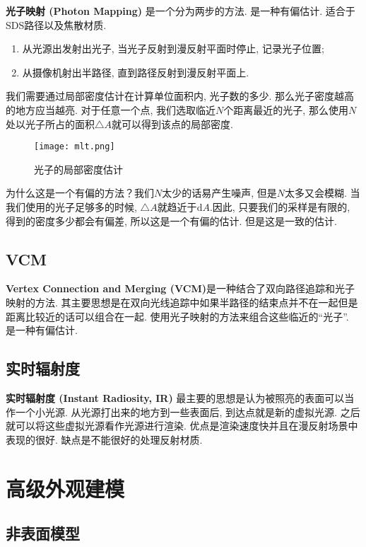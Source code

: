 \textbf{光子映射 (Photon Mapping) }是一个分为两步的方法. 是一种有偏估计. 适合于SDS路径以及焦散材质. 
\begin{enumerate}
	\item 从光源出发射出光子, 当光子反射到漫反射平面时停止, 记录光子位置; 
	\item 从摄像机射出半路径, 直到路径反射到漫反射平面上. 
\end{enumerate}

我们需要通过局部密度估计在计算单位面积内, 光子数的多少. 那么光子密度越高的地方应当越亮. 对于任意一个点, 我们选取临近$N$个距离最近的光子, 那么使用$N$处以光子所占的面积$\triangle A$就可以得到该点的局部密度. 

\begin{figure}[H]
	\centering
	\texttt{[image: mlt.png]}
	\caption{光子的局部密度估计}
	\label{fig:mlt}
\end{figure}

为什么这是一个有偏的方法？我们$N$太少的话易产生噪声, 但是$N$太多又会模糊. 当我们使用的光子足够多的时候, $\triangle A$就趋近于$\text{d}A$.因此, 只要我们的采样是有限的, 得到的密度多少都会有偏差, 所以这是一个有偏的估计. 但是这是一致的估计. 

\subsection{VCM}

\textbf{Vertex Connection and Merging (VCM)}是一种结合了双向路径追踪和光子映射的方法. 其主要思想是在双向光线追踪中如果半路径的结束点并不在一起但是距离比较近的话可以组合在一起. 使用光子映射的方法来组合这些临近的``光子”. 是一种有偏估计. 

\subsection{实时辐射度}

\textbf{实时辐射度 (Instant Radiosity, IR) }最主要的思想是认为被照亮的表面可以当作一个小光源. 从光源打出来的地方到一些表面后, 到达点就是新的虚拟光源. 之后就可以将这些虚拟光源看作光源进行渲染. 优点是渲染速度快并且在漫反射场景中表现的很好. 缺点是不能很好的处理反射材质. 

\section{高级外观建模}

\subsection{非表面模型}

